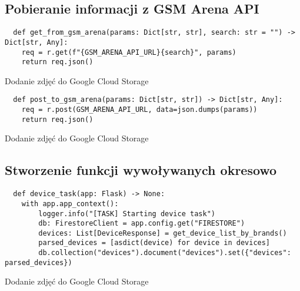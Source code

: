 \subsection{Pobieranie informacji z GSM Arena API}

\begin{code}[H]
  \begin{verbatim}
  def get_from_gsm_arena(params: Dict[str, str], search: str = "") -> Dict[str, Any]:
    req = r.get(f"{GSM_ARENA_API_URL}{search}", params)
    return req.json()
  \end{verbatim}
  \caption{Dodanie zdjęć do Google Cloud Storage}
  \label{get_from_gsm_arena}
\end{code}


\begin{code}[H]
  \begin{verbatim}
  def post_to_gsm_arena(params: Dict[str, str]) -> Dict[str, Any]:
    req = r.post(GSM_ARENA_API_URL, data=json.dumps(params))
    return req.json()
  \end{verbatim}
  \caption{Dodanie zdjęć do Google Cloud Storage}
  \label{post_from_gsm_arena}
\end{code}


\subsection{Stworzenie funkcji wywoływanych okresowo}


\begin{code}[H]
  \begin{verbatim}
  def device_task(app: Flask) -> None:
    with app.app_context():
        logger.info("[TASK] Starting device task")
        db: FirestoreClient = app.config.get("FIRESTORE")
        devices: List[DeviceResponse] = get_device_list_by_brands()
        parsed_devices = [asdict(device) for device in devices]
        db.collection("devices").document("devices").set({"devices": parsed_devices})
  \end{verbatim}
  \caption{Dodanie zdjęć do Google Cloud Storage}
  \label{device_task}
\end{code}

